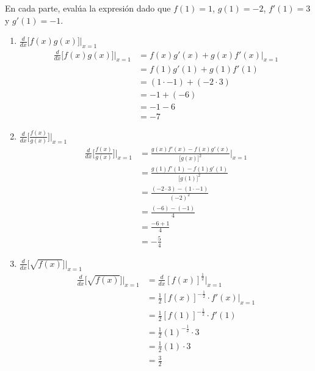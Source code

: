 \documentclass[12pt]{article}
\begin{document}
En cada parte, evalúa la expresión dado que $f(1)=1$, $g(1)=-2$, $f'(1)=3$ y $g'(1)=-1$.
\begin{enumerate}[label=(\alph*)]
\item $\frac{d}{dx} \lbrack f(x)g(x) \rbrack |_{x=1}$
  \begin{equation*}
    \begin{split}
      \frac{d}{dx} \lbrack f(x)g(x) \rbrack |_{x=1}
      & = f(x)g'(x)+g(x)f'(x) |_{x=1} \\
      & = f(1)g'(1)+g(1)f'(1) \\
      & = (1 \cdot -1) + (-2 \cdot 3) \\
      & = -1 + (-6) \\
      & = -1-6 \\
      & =-7
    \end{split}
  \end{equation*}

\item $\frac{d}{dx} \lbrack \frac{f(x)}{g(x)} \rbrack |_{x=1}$
  \begin{equation*}
    \begin{split}
      \frac{d}{dx} \lbrack \frac{f(x)}{g(x)} \rbrack |_{x=1}
      & = \frac{g(x)f'(x)-f(x)g'(x)}{\lbrack g(x) \rbrack ^2} |_{x=1} \\
      & = \frac{g(1)f'(1)-f(1)g'(1)}{\lbrack g(1) \rbrack ^2}\\
      & = \frac{(-2 \cdot 3)-(1 \cdot -1)}{(-2) ^2}\\
      & = \frac{(-6)-(-1)}{4}\\
      & = \frac{-6+1}{4}\\
      & = - \frac{5}{4}
    \end{split}
  \end{equation*}

\item $\frac{d}{dx} \lbrack \sqrt{f(x)} \rbrack |_{x=1}$
  \begin{equation*}
    \begin{split}
      \frac{d}{dx} \lbrack \sqrt{f(x)} \rbrack |_{x=1}
      & = \frac{d}{dx} { [f(x)]^{\frac{1}{2}} } |_{x=1} \\
      & = \frac{1}{2}[f(x)]^{-\frac{1}{2}} \cdot f'(x) |_{x=1} \\
      & = \frac{1}{2}[f(1)]^{-\frac{1}{2}} \cdot f'(1)  \\
      & = \frac{1}{2}(1)^{-\frac{1}{2}} \cdot 3  \\
      & = \frac{1}{2}(1) \cdot 3  \\
      & = \frac{3}{2}
    \end{split}
  \end{equation*}


\end{enumerate}
\end{document}
